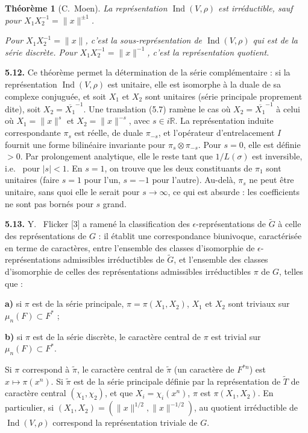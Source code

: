 \documentclass[12pt,a4paper]{article}
\theoremstyle{plain}
\newtheorem{theorem}{Théorème}[section]
\theoremstyle{definition}
\theoremstyle{remark}
\DeclareMathOperator{\Ind}{Ind}
\newcommand{\RR}{\mathbb{R}}
\newcommand{\wt}{\widetilde}
\newcommand{\ov}[1]{\overline{#1}}
\providecommand{\RR}{\mathbb{R}}
\begin{document}
\begin{theorem}[C.\ Moen]\label{thm:5.11}
La représentation $\Ind(V, \rho)$ est irréductible, sauf pour $X_1 X_2^{-1} = \|x\|^{\pm 1}$.

Pour $X_1 X_2^{-1} = \|x\|$, c'est la sous-représentation de $\Ind(V, \rho)$ qui est de la série discrète. Pour $X_1 X_2^{-1} = \|x\|^{-1}$, c'est la représentation quotient.
\end{theorem}

\textbf{5.12.} Ce théorème permet la détermination de la série complémentaire : si la représentation $\Ind(V, \rho)$ est unitaire, elle est isomorphe à la duale de sa complexe conjuguée, et soit $X_1$ et $X_2$ sont unitaires (série principale proprement dite), soit $X_2 = \ov{X_1}^{-1}$. Une translation (5.7) ramène le cas où $X_2 = \ov{X_1}^{-1}$ à celui où $X_1 = \|x\|^s$ et $X_2 = \|x\|^{-s}$, avec $s \in i\RR$. La représentation induite correspondante $\pi_s$ est réelle, de duale $\pi_{-s}$, et l'opérateur d'entrelacement $I$ fournit une forme bilinéaire invariante pour $\pi_s \otimes \pi_{-s}$. Pour $s = 0$, elle est définie $> 0$. Par prolongement analytique, elle le reste tant que $1/L(\sigma)$ est inversible, i.e.
\ pour $|s| < 1$. En $s = 1$, on trouve que les deux constituants de $\pi_1$ sont unitaires (faire $s = 1$ pour l'un, $s = -1$ pour l'autre). Au-delà, $\pi_s$ ne peut être unitaire, sans quoi elle le serait pour $s \to \infty$, ce qui est absurde : les coefficients ne sont pas bornés pour $s$ grand.

\textbf{5.13.} Y.
\ Flicker [3] a ramené la classification des $\epsilon$-représentations de $\wt{G}$ à celle des représentations de $G$ : il établit une correspondance biunivoque, caractérisée en terme de caractères, entre l'ensemble des classes d'isomorphie de $\epsilon$-représentations admissibles irréductibles de $\wt{G}$, et l'ensemble des classes d'isomorphie de celles des représentations admissibles irréductibles $\pi$ de $G$, telles que :

\textbf{a)} si $\pi$ est de la série principale, $\pi = \pi(X_1, X_2)$, $X_1$ et $X_2$ sont triviaux sur $\mu_n(F) \subset F^*$ ;

\textbf{b)} si $\pi$ est de la série discrète, le caractère central de $\pi$ est trivial sur $\mu_n(F) \subset F^*$.

Si $\pi$ correspond à $\wt{\pi}$, le caractère central de $\wt{\pi}$ (un caractère de $F^{*n}$) est $x \mapsto \pi(x^n)$. Si $\wt{\pi}$ est de la série principale définie par la représentation de $\wt{T}$ de caractère central $(\chi_1, \chi_2)$, et que $X_i = \chi_i(x^n)$, $\pi$ est $\pi(X_1, X_2)$. En particulier, si $(X_1, X_2) = (\|x\|^{1/2}, \|x\|^{-1/2})$, au quotient irréductible de $\Ind(V, \rho)$ correspond la représentation triviale de $G$.
\end{document}
